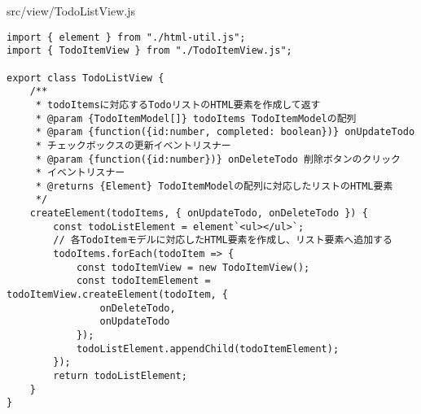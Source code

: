 \begin{listtitle}
src/view/TodoListView.js
\end{listtitle}
\begin{lstlisting}
import { element } from "./html-util.js";
import { TodoItemView } from "./TodoItemView.js";

export class TodoListView {
    /**
     * todoItemsに対応するTodoリストのHTML要素を作成して返す
     * @param {TodoItemModel[]} todoItems TodoItemModelの配列
     * @param {function({id:number, completed: boolean})} onUpdateTodo
     * チェックボックスの更新イベントリスナー
     * @param {function({id:number})} onDeleteTodo 削除ボタンのクリック
     * イベントリスナー
     * @returns {Element} TodoItemModelの配列に対応したリストのHTML要素
     */
    createElement(todoItems, { onUpdateTodo, onDeleteTodo }) {
        const todoListElement = element`<ul></ul>`;
        // 各TodoItemモデルに対応したHTML要素を作成し、リスト要素へ追加する
        todoItems.forEach(todoItem => {
            const todoItemView = new TodoItemView();
            const todoItemElement = todoItemView.createElement(todoItem, {
                onDeleteTodo,
                onUpdateTodo
            });
            todoListElement.appendChild(todoItemElement);
        });
        return todoListElement;
    }
}
\end{lstlisting}
\listend
